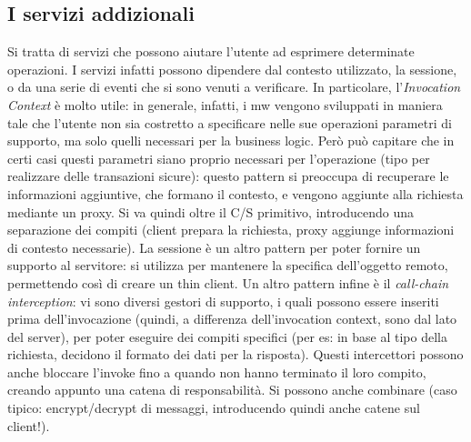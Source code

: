 \subsection{I servizi addizionali}
Si tratta di servizi che possono aiutare l'utente ad esprimere determinate operazioni. I servizi infatti possono
dipendere dal contesto utilizzato, la sessione, o da una serie di eventi che si sono venuti a verificare.
In particolare, l'\textit{Invocation Context} è molto utile: in generale, infatti, i mw vengono sviluppati in maniera
tale che l'utente non sia costretto a specificare nelle sue operazioni parametri di supporto, ma solo quelli necessari
per la business logic. Però può capitare che in certi casi questi parametri siano proprio necessari per l'operazione
(tipo per realizzare delle transazioni sicure): questo pattern si preoccupa di recuperare le informazioni aggiuntive,
che formano il contesto, e vengono aggiunte alla richiesta mediante un proxy. Si va quindi oltre il C/S primitivo,
introducendo una separazione dei compiti (client prepara la richiesta, proxy aggiunge informazioni di contesto
necessarie). La sessione è un altro pattern per poter fornire un supporto al servitore: si utilizza per mantenere la
specifica dell'oggetto remoto, permettendo così di creare un thin client.
Un altro pattern infine è il \textit{call-chain interception}: vi sono diversi gestori di supporto, i quali possono
essere inseriti prima dell'invocazione (quindi, a differenza dell'invocation context, sono dal lato del server), per
poter eseguire dei compiti specifici (per es: in base al tipo della richiesta, decidono il formato dei dati per la
risposta). Questi intercettori possono anche bloccare l'invoke fino a quando non hanno terminato il loro compito,
creando appunto una catena di responsabilità. Si possono anche combinare (caso tipico: encrypt/decrypt di messaggi,
introducendo quindi anche catene sul client!).
